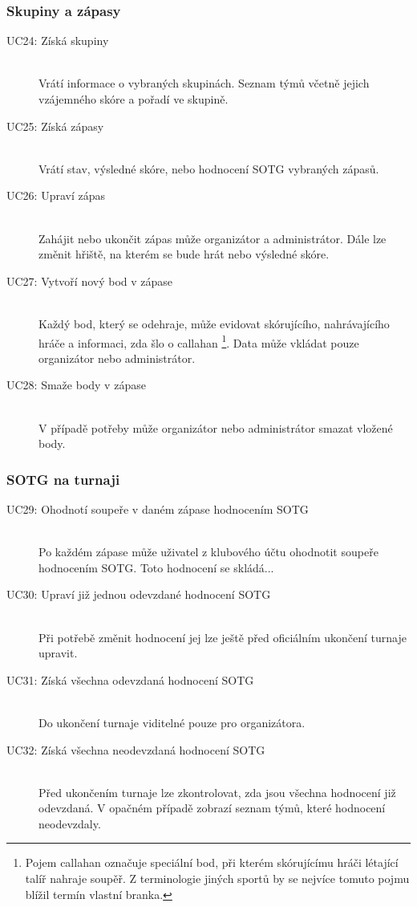   \subsubsection*{Skupiny a zápasy}
    \begin{description}
      \item[UC24: Získá skupiny] \hfill \\
      Vrátí informace o vybraných skupinách. Seznam týmů včetně jejich vzájemného skóre a pořadí ve skupině.
      \item[UC25: Získá zápasy] \hfill \\
      Vrátí stav, výsledné skóre, nebo hodnocení SOTG vybraných zápasů.
      \item[UC26: Upraví zápas] \hfill \\
      Zahájit nebo ukončit zápas může organizátor a administrátor. Dále lze změnit hřiště, na kterém se bude hrát nebo výsledné skóre.
      \item[UC27: Vytvoří nový bod v zápase] \hfill \\
      Každý bod, který se odehraje, může evidovat skórujícího, nahrávajícího hráče a informaci, zda šlo o callahan
      \footnote{Pojem callahan označuje speciální bod, při kterém skórujícímu hráči létající talíř nahraje soupěř.
      Z terminologie jiných sportů by se nejvíce tomuto pojmu blížil termín vlastní branka.}.
      Data může vkládat pouze organizátor nebo administrátor.
      \item[UC28: Smaže body v zápase] \hfill \\
      V případě potřeby může organizátor nebo administrátor smazat vložené body.
    \end{description}
  
  \subsubsection*{SOTG na turnaji}
    \begin{description}
      \item[UC29: Ohodnotí soupeře v daném zápase hodnocením SOTG ] \hfill \\
      Po každém zápase může uživatel z klubového účtu ohodnotit soupeře hodnocením SOTG. Toto hodnocení se skládá...
      \item[UC30: Upraví již jednou odevzdané hodnocení SOTG ] \hfill \\
      Při potřebě změnit hodnocení jej lze ještě před oficiálním ukončení turnaje upravit.
      \item[UC31: Získá všechna odevzdaná hodnocení SOTG] \hfill \\
      Do ukončení turnaje viditelné pouze pro organizátora.
      \item[UC32: Získá všechna neodevzdaná hodnocení SOTG] \hfill \\
      Před ukončením turnaje lze zkontrolovat, zda jsou všechna hodnocení již odevzdaná.
      V opačném případě zobrazí seznam týmů, které hodnocení neodevzdaly.
    \end{description}
    
